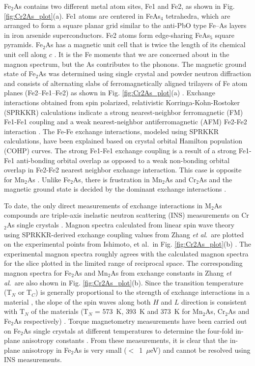 \documentclass[10pt,doublespacing,edeposit]{uiucthesis2020}
\begin{document}
\begin{mainmatter}
Fe$_2$As contains two different metal atom sites, Fe1 and Fe2, as shown in Fig. \ref{fig:Cr2As_plot}(a). Fe1 atoms are centered in FeAs$_4$ tetrahedra, which are arranged to form a square planar grid similar to the anti-PbO type Fe--As layers in iron arsenide superconductors. 
Fe2 atoms form edge-sharing FeAs$_5$ square pyramids. 
Fe$_2$As has a magnetic unit cell that is twice the length of its chemical unit cell along $c$ \cite{Zhang2013,Katsuraki1966}.  It is the Fe moments that we are concerned about in the magnon spectrum, but the As contributes to the phonons. The magnetic ground state of Fe$_2$As was determined using single crystal and powder neutron diffraction and consists of alternating slabs of ferromagnetically aligned trilayers of Fe atom planes (Fe2--Fe1--Fe2) as shown in Fig. \ref{fig:Cr2As_plot}(a) \cite{Katsuraki1966}.
Exchange interactions obtained from  spin polarized, relativistic Korringa-Kohn-Rostoker (SPRKKR)  calculations indicate a strong nearest-neighbor ferromagnetic (FM) Fe1-Fe1 coupling and a weak nearest-neighbor antiferromagnetic (AFM) Fe2-Fe2 interaction \cite{Zhang2013}.
The Fe-Fe exchange interactions, modeled using SPRKKR calculations, have been explained based on crystal orbital Hamilton population (COHP) curves. The strong Fe1-Fe1 exchange coupling is a result of a strong Fe1-Fe1 anti-bonding orbital overlap as opposed to a weak non-bonding orbital overlap in Fe2-Fe2 nearest neighbor exchange interaction. This case is opposite for Mn$_2$As \cite{Zhang2013}.
Unlike Fe$_2$As, there is frustration in Mn$_2$As and Cr$_2$As and the magnetic ground state is decided by the dominant exchange interactions \cite{Zhang2013}.


To date, the only direct measurements of exchange interactions in M$_2$As compounds are triple-axis inelastic neutron scattering (INS) measurements on Cr$_2$As single crystals \cite{Yuzuri1960,Ishimoto1995}.
Magnon spectra calculated from linear spin wave theory using SPRKKR-derived exchange coupling values from Zhang \emph{et al}.\ are plotted on the experimental points from Ishimoto, et al.\ in Fig. \ref{fig:Cr2As_plot}(b) \cite{Zhang2013,Ishimoto1995}. The experimental magnon spectra roughly agrees with the calculated magnon spectra for the slice plotted in the limited range of reciprocal space. The corresponding magnon spectra for Fe$_2$As and Mn$_2$As from exchange constants in Zhang \emph{et al}.\ are also shown in Fig. \ref{fig:Cr2As_plot}(b). 
Since the transition temperature (T$_N$ or T$_C$) is generally proportional to the strength of exchange interactions in a material \cite{Krishnan2016}, the slope of the spin waves along both $H$ and $L$ direction is consistent with T$_N$ of the materials (T$_N$ = 573~K, 393~K and 373~K for Mn$_2$As, Cr$_2$As and Fe$_2$As respectively) \cite{Zhang2013}.
Torque magnetometry measurements have been carried out on Fe$_2$As single crystals at different temperatures to determine the four-fold in-plane anisotropy constants \cite{Yang2020,Achiwa1967}. From these measurements, it is clear that the in-plane anisotropy in Fe$_2$As is very small ($<$~1~$\mu$eV) and cannot be resolved using INS measurements. 


\end{mainmatter}
\end{document}
